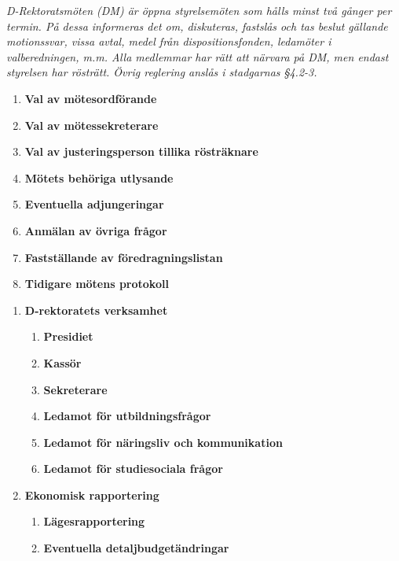 \documentclass{dagordning}
\begin{document}
{\small \textit{D-Rektoratsmöten (DM) är öppna styrelsemöten som hålls minst två gånger per termin. På dessa informeras det om, diskuteras, fastslås och tas beslut gällande motionssvar, vissa avtal, medel från dispositionsfonden, ledamöter i valberedningen, m.m. Alla medlemmar har rätt att närvara på DM, men endast styrelsen har rösträtt. Övrig reglering anslås i stadgarnas §4.2-3.}}\\


  \begin{enumerate}
    \item \textbf{Val av mötesordförande}
    \item \textbf{Val av mötessekreterare}
    \item \textbf{Val av justeringsperson tillika rösträknare}
    \item \textbf{Mötets behöriga utlysande}
    \item \textbf{Eventuella adjungeringar}
    \item \textbf{Anmälan av övriga frågor}
    \item \textbf{Fastställande av föredragningslistan}
    \item \textbf{Tidigare mötens protokoll}
  \end{enumerate}


  \begin{enumerate}
    \item \textbf{D-rektoratets verksamhet}
	\begin{enumerate}
        \item \textbf{Presidiet}
        \item \textbf{Kassör}
        \item \textbf{Sekreterare}
        \item \textbf{Ledamot för utbildningsfrågor}
        \item \textbf{Ledamot för näringsliv och kommunikation}
        \item \textbf{Ledamot för studiesociala frågor}
	\end{enumerate}
    \item \textbf{Ekonomisk rapportering}
	\begin{enumerate}
        \item \textbf{Lägesrapportering}
        \item \textbf{Eventuella detaljbudgetändringar}
	\end{enumerate}
  \end{enumerate}
\end{document}
